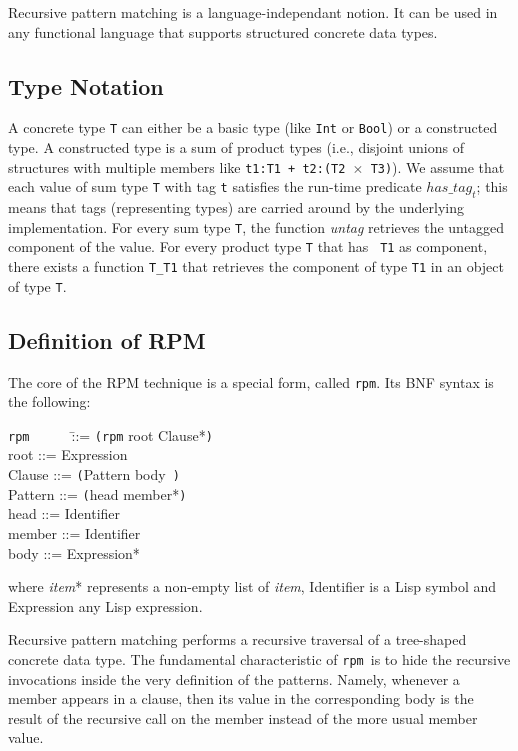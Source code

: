 \documentclass[a4paper,11pt]{article}
\newcommand{\rpm}{\texttt{rpm}}
\begin{document}
Recursive pattern matching is a language-independant notion. It can be
used in any functional language that supports structured concrete data
types. 

\subsection{Type Notation}

A concrete type \texttt{T} can either be a basic type (like \texttt{Int} or
\texttt{Bool}) or a constructed type. A constructed type is a sum of
product types (i.e., disjoint unions of structures with multiple
members like \texttt{t1:T1 + t2:(T2 $\times$ T3)}). We assume that each
value of sum type \texttt{T} with tag \texttt{t} satisfies the run-time
predicate $has\_tag_t$; this means that tags (representing
types) are carried around by the underlying implementation. For every
sum type \texttt{T}, the function \emph{untag} retrieves the untagged
component of the value.  For every product type \texttt{T} that has {\tt
T1} as component, there exists a function \texttt{T\_T1} that retrieves
the component of type \texttt{T1} in an object of type \texttt{T}.

\subsection{Definition of RPM}

The core of the RPM technique is a special form, called \rpm. Its
BNF syntax is the following:
\begin{tabbing}
\texttt{rpm}~~~~~~\=::= \texttt{(rpm} root Clause*\texttt{)} \\
root    \>::= Expression \\
Clause  \>::= \texttt{(}Pattern body\texttt{ )} \\
Pattern \>::= \texttt{(}head member*\texttt{)} \\
head    \>::= Identifier \\
member  \>::= Identifier \\
body    \>::= Expression*
\end{tabbing}
where \emph{item}* represents a non-empty list of \emph{item},
Identifier is a Lisp symbol and Expression any Lisp expression.

Recursive pattern matching performs a recursive traversal of a
tree-shaped concrete data type. The fundamental characteristic of
\rpm\ is to hide the recursive invocations inside the very definition
of the patterns. Namely, whenever a member appears in a clause, then
its value in the corresponding body is the result of the recursive
call on the member instead of the more usual member value.
\end{document}
